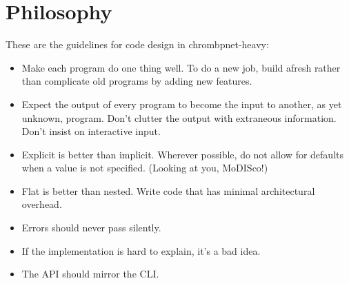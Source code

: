 \documentclass{article}
\begin{document}
\section{Philosophy}
These are the guidelines for code design in chrombpnet-heavy:

\begin{itemize}
    \item Make each program do one thing well. To do a new job, build afresh rather than complicate old programs by adding new features.
    \item Expect the output of every program to become the input to another, as yet unknown, program. Don't clutter the output with extraneous information. Don't insist on interactive input. 
    \item Explicit is better than implicit. Wherever possible, do not allow for defaults when a value is not specified.  (Looking at you, MoDISco!)
    \item Flat is better than nested. Write code that has minimal architectural overhead. 
    \item Errors should never pass silently.
    \item If the implementation is hard to explain, it's a bad idea.
    \item The API should mirror the CLI. 
\end{itemize}
\end{document}
